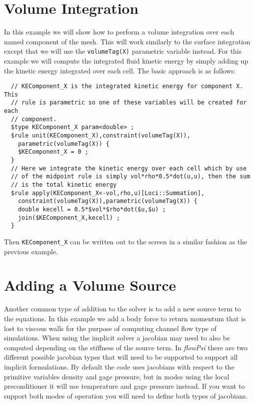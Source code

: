 \documentclass[letterpaper,twoside]{article}
\begin{document}
\section{Volume Integration}
In this example we will show how to perform a volume integration over
each named component of the mesh.  This will work similarly to the
surface integration except that we will use the {\tt volumeTag(X)}
parametric variable instead.  For this example we will compute the
integrated fluid kinetic energy by simply adding up the kinetic energy
integrated over each cell.  The basic approach is as follows:
\begin{verbatim}
  // KEComponent_X is the integrated kinetic energy for component X.  This
  // rule is parametric so one of these variables will be created for each
  // component.
  $type KEComponent_X param<double> ;
  $rule unit(KEComponent_X),constraint(volumeTag(X)),
    parametric(volumeTag(X)) {
    $KEComponent_X = 0 ;
  }
  // Here we integrate the kinetic energy over each cell which by use
  // of the midpoint rule is simply vol*rho*0.5*dot(u,u), then the sum
  // is the total kinetic energy
  $rule apply(KEComponent_X<-vol,rho,u)[Loci::Summation],
    constraint(volumeTag(X)),parametric(volumeTag(X)) {
    double kecell = 0.5*$vol*$rho*dot($u,$u) ;
    join($KEComponent_X,kecell) ;
  }
\end{verbatim}
Then {\tt KEComponent\_X} can be written out to the screen in a similar
fashion as the previous example.


\clearpage
\section{Adding a Volume Source}

Another common type of addition to the solver is to add a new source
term to the equations.  In this example we add a body force to return
momentum that is lost to viscous walls for the purpose of computing
channel flow type of simulations.  When using the implicit solver a
jacobian may need to also be computed depending on the stiffness of
the source term.  In {\it flowPsi} there are two different possible
jacobian types that will need to be supported to support all implicit
formulations.  By default the code uses jacobians with respect to the
primitive variables density and gage pressure, but in modes using the
local preconditioner it will use temperature and gage pressure
instead.  If you want to support both modes of operation you will need
to define both types of jacobians.
\end{document}
